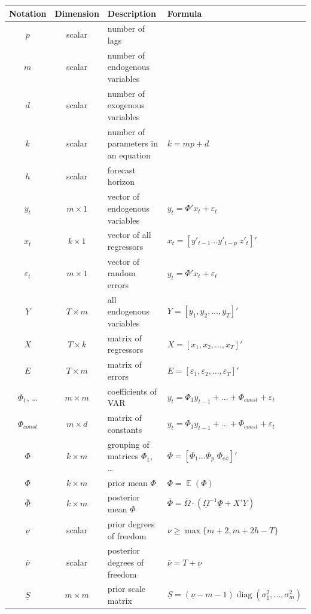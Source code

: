 \documentclass[12pt]{article} %
\DeclareMathOperator{\E}{\mathbb{E}}
\DeclareMathOperator{\diag}{diag}
\newcommand{\prior}{\underline}
\newcommand{\post}{\overline}
\begin{document}
\begin{center}
\begin{tabular}{ccp{6cm}l}
\toprule
Notation & Dimension &  Description & Formula \\
\midrule
$p$ & scalar & number of lags & \\
$m$ & scalar & number of endogenous variables & \\
$d$ & scalar & number of exogenous variables & \\
$k$ & scalar & number of parameters in an equation & $k=mp+d$ \\
$h$ & scalar & forecast horizon &  \\
\midrule
$y_t$ & $m \times 1$ &  vector of endogenous variables   & $y_t=\Phi' x_t+\varepsilon_t$ \\
$x_t$ & $k \times 1$ & vector of all regressors & $x_t=[ y'_{t-1} \ldots  y'_{t-p} \; z'_t ]'$ \\
$\varepsilon_t$ & $m \times 1$ & vector of random errors & $y_t=\Phi' x_t+\varepsilon_t$\\
$Y$ & $T \times m$ & all endogenous variables & $Y=[y_1, y_2,\ldots, y_T]'$ \\
$X$ & $T \times k$ & matrix of regressors& $X=[x_1, x_2,\ldots, x_T]'$ \\
$E$ & $T \times m$ & matrix of errors & $E=[\varepsilon_1, \varepsilon_2,\ldots, \varepsilon_T]'$ \\
\midrule
$\Phi_1$, \ldots & $m \times m$ & coefficients of VAR & $y_t= \Phi_1 y_{t-1} + \ldots + \Phi_{const} +\varepsilon_t$ \\
$\Phi_{const}$ & $m \times d$ & matrix of constants & $y_t= \Phi_1 y_{t-1} + \ldots + \Phi_{const} +\varepsilon_t$\\
$\Phi$ & $k \times m$ & grouping of matrices $\Phi_1$, \ldots & $\Phi=[ \Phi_1 \ldots \Phi_p \; \Phi_{ex}]'$ \\
\midrule %
$\prior \Phi$ & $k \times m$ & prior mean $\Phi$ & $\prior \Phi = \E (\Phi)$ \\
$\post \Phi$ & $k \times m$ & posterior mean $\Phi$ & $\post \Phi=\post{\Omega}\cdot (\prior \Omega^{-1}\prior \Phi+X'Y)$\\
$\prior \nu $ & scalar & prior degrees of freedom& $\nu\ge\max\lbrace m+2, m+2h-T\rbrace$ \\
$\post \nu $ & scalar & posterior degrees of freedom & $\post \nu = T + \prior \nu$ \\
$\prior S $ & $m \times m$& prior scale matrix& $\prior S= (\prior \nu- m- 1)\diag(\sigma^2_{1},\ldots,\sigma^2_{m})$\\

\end{tabular}
\end{center}
\end{document}

